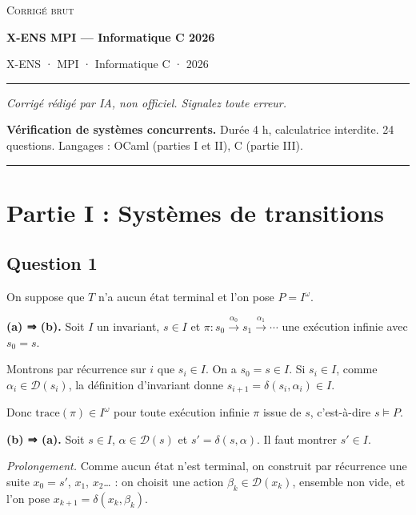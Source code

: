 \documentclass[11pt,a4paper]{article}
\begin{document}
\thispagestyle{plain}
\begin{center}
  {\small\scshape Corrigé brut}\par\smallskip
  {\LARGE\bfseries X-ENS MPI — Informatique C 2026\par}\medskip
  {\large X-ENS · MPI · Informatique C · 2026\par}
\end{center}
\vspace{2pt}\hrule\vspace{8pt}

\emph{Corrigé rédigé par IA, non officiel. Signalez toute erreur.}

\textbf{Vérification de systèmes concurrents.} Durée 4 h, calculatrice interdite. 24 questions. Langages : OCaml (parties I et II), C (partie III).

\begin{center}\rule{0.5\linewidth}{0.5pt}\end{center}

\hypertarget{partie-i-systuxe8mes-de-transitions}{%
\section{Partie I : Systèmes de transitions}\label{partie-i-systuxe8mes-de-transitions}}

\hypertarget{question-1}{%
\subsection{Question 1}\label{question-1}}

On suppose que \(T\) n'a aucun état terminal et l'on pose \(P=I^\omega\).

\textbf{(a) ⇒ (b).} Soit \(I\) un invariant, \(s\in I\) et \(\pi:s_0\xrightarrow{\alpha_0}s_1\xrightarrow{\alpha_1}\cdots\) une exécution infinie avec \(s_0=s\).

Montrons par récurrence sur \(i\) que \(s_i\in I\). On a \(s_0=s\in I\). Si \(s_i\in I\), comme \(\alpha_i\in\mathcal D(s_i)\), la définition d'invariant donne \(s_{i+1}=\delta(s_i,\alpha_i)\in I\).

Donc \(\mathrm{trace}(\pi)\in I^\omega\) pour toute exécution infinie \(\pi\) issue de \(s\), c'est-à-dire \(s\models P\).

\textbf{(b) ⇒ (a).} Soit \(s\in I\), \(\alpha\in\mathcal D(s)\) et \(s'=\delta(s,\alpha)\). Il faut montrer \(s'\in I\).

\emph{Prolongement.} Comme aucun état n'est terminal, on construit par récurrence une suite \(x_0=s'\), \(x_1\), \(x_2\)\ldots{} : on choisit une action \(\beta_k\in\mathcal D(x_k)\), ensemble non vide, et l'on pose \(x_{k+1}=\delta(x_k,\beta_k)\).
\end{document}
